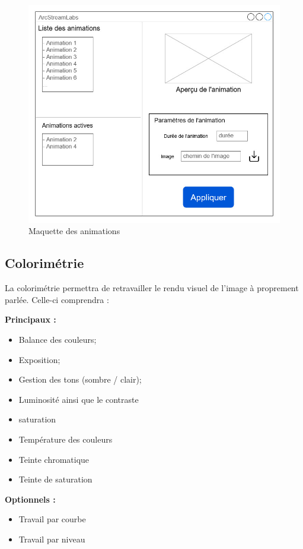 \begin{figure}[h]
  \centering
  \includegraphics[width=\textwidth]{./images/P2_Maquette_Animations.jpg}
  \caption{Maquette des animations}
  \label{maquette_animation}
\end{figure}

\subsection{Colorimétrie}

La colorimétrie permettra de retravailler le rendu visuel de l'image à proprement parlée. Celle-ci comprendra :

\textbf{ Principaux : }

\begin{itemize}
  \item Balance des couleurs;
  \item Exposition;
  \item Gestion des tons (sombre / clair);
  \item Luminosité ainsi que le contraste
  \item saturation
  \item Température des couleurs
  \item Teinte chromatique
  \item Teinte de saturation
\end{itemize}

\textbf{ Optionnels : }

\begin{itemize}
  \item Travail par courbe
  \item Travail par niveau
\end{itemize}

